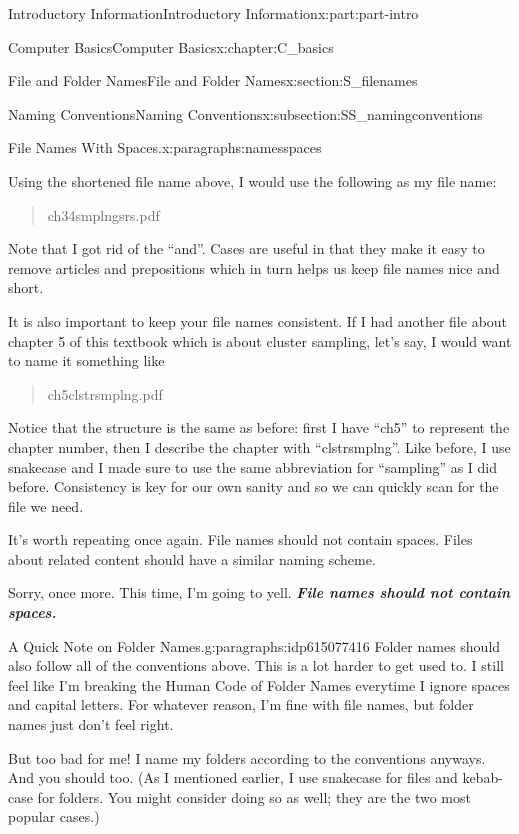 \documentclass[oneside,10pt,]{book}
\newcommand{\alert}[1]{\textbf{\textit{#1}}}
\begin{document}
\begin{partptx}{Introductory Information}{}{Introductory Information}{}{}{x:part:part-intro}
\begin{chapterptx}{Computer Basics}{}{Computer Basics}{}{}{x:chapter:C_basics}
\begin{sectionptx}{File and Folder Names}{}{File and Folder Names}{}{}{x:section:S_filenames}
\begin{subsectionptx}{Naming Conventions}{}{Naming Conventions}{}{}{x:subsection:SS_namingconventions}
\begin{paragraphs}{File Names With Spaces.}{x:paragraphs:namesspaces}
\par
Using the shortened file name above, I would use the following as my file name: \begin{quote}%
ch3\textunderscore{}4\textunderscore{}smplng\textunderscore{}srs.pdf\end{quote}
 Note that I got rid of the ``and''. Cases are useful in that they make it easy to remove articles and prepositions which in turn helps us keep file names nice and short.%
\par
It is also important to keep your file names consistent. If I had another file about chapter 5 of this textbook which is about cluster sampling, let's say, I would want to name it something like \begin{quote}%
ch5\textunderscore{}clstr\textunderscore{}smplng.pdf\end{quote}
 Notice that the structure is the same as before: first I have ``ch5'' to represent the chapter number, then I describe the chapter with ``clstr\textunderscore{}smplng''. Like before, I use snake\textunderscore{}case and I made sure to use the same abbreviation for ``sampling'' as I did before. Consistency is key for our own sanity and so we can quickly scan for the file we need.%
\par
It's worth repeating once again. File names should not contain spaces. Files about related content should have a similar naming scheme.%
\par
Sorry, once more. This time, I'm going to yell. \alert{File names should not contain spaces.}%
\end{paragraphs}%
\begin{paragraphs}{A Quick Note on Folder Names.}{g:paragraphs:idp615077416}%
%
%
Folder names should also follow all of the conventions above. This is a lot harder to get used to. I still feel like I'm breaking the Human Code of Folder Names everytime I ignore spaces and capital letters. For whatever reason, I'm fine with file names, but folder names just don't feel right.%
\par
But too bad for me! I name my folders according to the conventions anyways. And you should too. (As I mentioned earlier, I use snake\textunderscore{}case for files and kebab-case for folders. You might consider doing so as well; they are the two most popular cases.)%
\end{paragraphs}%
\end{subsectionptx}
%
%
\typeout{************************************************}

\end{sectionptx}
\end{chapterptx}
\end{partptx}
\end{document}
